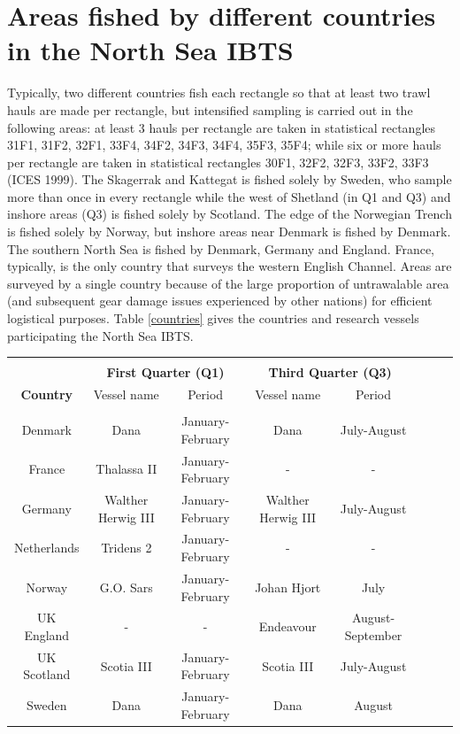 \documentclass[a4paper 12pt]{article}
\numberwithin{equation}{section}
\begin{document}
{\section{\large Areas fished by different countries in the North Sea IBTS}
\label{secAp:areasfishedappendix}
Typically, two different countries fish each rectangle so that at least two trawl hauls are made per rectangle, but intensified sampling is carried out in the following areas: at least 3 hauls per rectangle are taken in statistical rectangles  31F1, 31F2, 32F1, 33F4, 34F2, 34F3, 34F4, 35F3, 35F4; while six or more hauls per rectangle are taken in statistical rectangles  30F1, 32F2, 32F3, 33F2, 33F3 (ICES 1999).  The Skagerrak and Kattegat is fished solely by Sweden, who sample more than once in every rectangle while the west of Shetland (in Q1 and Q3) and inshore areas (Q3) is fished solely by Scotland. The edge of the Norwegian Trench is fished solely by Norway, but inshore areas near Denmark is fished by Denmark. The southern North Sea is fished by Denmark, Germany and England. France, typically, is the only country that surveys the western English Channel. Areas are surveyed by a single country because of the large proportion of untrawalable area (and subsequent gear damage issues experienced by other nations)  for efficient logistical purposes. Table \ref{countries} gives the countries and research vessels participating the North Sea IBTS.\\
\begin{small}
\begin{table}[h!]
\centering
{}
\begin{tabular}{cccccccc}
\hline \\[0.1ex]
  & \multicolumn{2}{c}{\bf First Quarter (Q1)} & \multicolumn{2}{c}{\bf Third Quarter (Q3)}\\[1.5ex]
{\bf Country }  & Vessel name & Period    & Vessel name & Period  \\[0.5ex]
\hline \\[0.5ex]
Denmark  &   Dana   &   January-February  & Dana & July-August    \\[1ex]
France  & Thalassa II & January-February & - & -   \\[1ex]
Germany   &  Walther  Herwig III & January-February   &   Walther  Herwig III & July-August \\[1ex]
Netherlands &  Tridens 2 &  January-February   & - & -     \\[1ex]
Norway  &   G.O. Sars  & January-February &    Johan Hjort  & July   \\[1ex]
UK England &- & -&  Endeavour &  August-September  \\[1ex]
UK Scotland   &  Scotia III &  January-February & Scotia III &  July-August \\[1ex]
Sweden  &  Dana &  January-February  &  Dana &  August                  \\[0.5ex]
\hline
\end{tabular}
\end{table}
\end{small}

}
\end{document}

